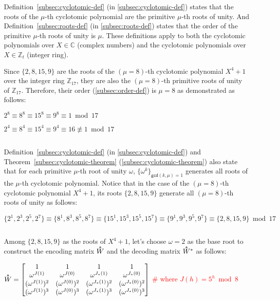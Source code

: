 $ $

Definition~\ref*{subsec:cyclotomic-def} (in \autoref{subsec:cyclotomic-def}) states that the roots of the $\mu$-th cyclotomic polynomial are the primitive $\mu$-th roots of unity. And Definition~\ref*{subsec:roots-def} (in \autoref{subsec:roots-def}) states that the order of the primitive $\mu$-th roots of unity is $\mu$. These definitions apply to both the cyclotomic polynomials over $X\in\mathbb{C}$ (complex numbers) and the cyclotomic polynomials over $X \in \mathbb{Z}_t$ (integer ring). 

Since $\{2, 8, 15, 9\}$ are the roots of the $(\mu=8)$-th cyclotomic polynomial $X^4 + 1$ over the integer ring $\mathbb{Z}_{17}$, they are also the $(\mu=8)$-th primitive roots of unity of $\mathbb{Z}_{17}$. Therefore, their order (\autoref{subsec:order-def}) is $\mu=8$ as demonstrated as follows: 

$2^8 \equiv 8^8 \equiv 15^8 \equiv 9^8 \equiv 1 \bmod 17$

$2^4 \equiv 8^4 \equiv 15^4 \equiv 9^4 \equiv 16 \not\equiv 1 \bmod 17$

$ $

Definition~\ref*{subsec:cyclotomic-def} (in \autoref{subsec:cyclotomic-def}) and Theorem~\ref*{subsec:cyclotomic-theorem} (\autoref{subsec:cyclotomic-theorem}) also state that for each primitive $\mu$-th root of unity $\omega$, $\{\omega^k\}_{\textsf{gcd}(k, \mu) = 1}$ generates all roots of the $\mu$-th cyclotomic polynomial. Notice that in the case of the $(\mu=8)$-th cyclotomic polynomial $X^4 + 1$, its roots $\{2, 8, 15, 9\}$ generate all $(\mu=8)$-th roots of unity as follows:

$\{2^1, 2^3, 2^5, 2^7\} \equiv \{8^1, 8^3, 8^5, 8^7\} \equiv \{15^1, 15^3, 15^5, 15^7\} \equiv \{9^1, 9^3, 9^5, 9^7\} \equiv \{2, 8, 15, 9\} \bmod 17$

$ $

Among $\{2, 8, 15, 9\}$ as the roots of $X^4 + 1$, let's choose $\omega = 2$ as the base root to construct the encoding matrix $\hathat W$ and the decoding matrix $\hathat W^*$ as follows: 

$\hathat W = \begin{bmatrix}
1 & 1 & 1 & 1\\
\omega^{J(1)} & \omega^{J(0)} & \omega^{J_*(1)} & \omega^{J_*(0)}\\
(\omega^{J(1)})^2 & (\omega^{J(0)})^2 & (\omega^{J_*(1)})^2 & (\omega^{J_*(0)})^2\\
(\omega^{J(1)})^3 & (\omega^{J(0)})^3 & (\omega^{J_*(1)})^3 & (\omega^{J_*(0)})^3\\
\end{bmatrix}$ \textcolor{red}{\text{ } \# where $J(h) = 5^h \bmod 8$}

